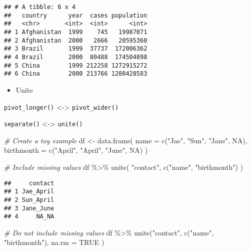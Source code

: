 \documentclass[
]{book}
\newenvironment{Shaded}{\begin{snugshade}}{\end{snugshade}}
\newcommand{\AttributeTok}[1]{\textcolor[rgb]{0.77,0.63,0.00}{#1}}
\newcommand{\CommentTok}[1]{\textcolor[rgb]{0.56,0.35,0.01}{\textit{#1}}}
\newcommand{\ConstantTok}[1]{\textcolor[rgb]{0.00,0.00,0.00}{#1}}
\newcommand{\FunctionTok}[1]{\textcolor[rgb]{0.00,0.00,0.00}{#1}}
\newcommand{\NormalTok}[1]{#1}
\newcommand{\OtherTok}[1]{\textcolor[rgb]{0.56,0.35,0.01}{#1}}
\newcommand{\SpecialCharTok}[1]{\textcolor[rgb]{0.00,0.00,0.00}{#1}}
\newcommand{\StringTok}[1]{\textcolor[rgb]{0.31,0.60,0.02}{#1}}
\providecommand{\tightlist}{%
  \setlength{\itemsep}{0pt}\setlength{\parskip}{0pt}}
\begin{document}
\begin{verbatim}
## # A tibble: 6 x 4
##   country      year  cases population
##   <chr>       <int>  <int>      <int>
## 1 Afghanistan  1999    745   19987071
## 2 Afghanistan  2000   2666   20595360
## 3 Brazil       1999  37737  172006362
## 4 Brazil       2000  80488  174504898
## 5 China        1999 212258 1272915272
## 6 China        2000 213766 1280428583
\end{verbatim}

\begin{itemize}
\tightlist
\item
  Unite
\end{itemize}

\texttt{pivot\_longer()} \textless-\textgreater{} \texttt{pivot\_wider()}

\texttt{separate()} \textless-\textgreater{} \texttt{unite()}

\begin{Shaded}
\begin{Highlighting}[]
\CommentTok{\# Create a toy example}
\NormalTok{df }\OtherTok{\textless{}{-}} \FunctionTok{data.frame}\NormalTok{(}
  \AttributeTok{name =} \FunctionTok{c}\NormalTok{(}\StringTok{"Jae"}\NormalTok{, }\StringTok{"Sun"}\NormalTok{, }\StringTok{"Jane"}\NormalTok{, }\ConstantTok{NA}\NormalTok{),}
  \AttributeTok{birthmonth =} \FunctionTok{c}\NormalTok{(}\StringTok{"April"}\NormalTok{, }\StringTok{"April"}\NormalTok{, }\StringTok{"June"}\NormalTok{, }\ConstantTok{NA}\NormalTok{)}
\NormalTok{)}

\CommentTok{\# Include missing values}
\NormalTok{df }\SpecialCharTok{\%\textgreater{}\%} \FunctionTok{unite}\NormalTok{(}
  \StringTok{"contact"}\NormalTok{,}
  \FunctionTok{c}\NormalTok{(}\StringTok{"name"}\NormalTok{, }\StringTok{"birthmonth"}\NormalTok{)}
\NormalTok{)}
\end{Highlighting}
\end{Shaded}

\begin{verbatim}
##     contact
## 1 Jae_April
## 2 Sun_April
## 3 Jane_June
## 4     NA_NA
\end{verbatim}

\begin{Shaded}
\begin{Highlighting}[]
\CommentTok{\# Do not include missing values}
\NormalTok{df }\SpecialCharTok{\%\textgreater{}\%} \FunctionTok{unite}\NormalTok{(}\StringTok{"contact"}\NormalTok{,}
  \FunctionTok{c}\NormalTok{(}\StringTok{"name"}\NormalTok{, }\StringTok{"birthmonth"}\NormalTok{),}
  \AttributeTok{na.rm =} \ConstantTok{TRUE}
\NormalTok{)}
\end{Highlighting}
\end{Shaded}
\end{document}
